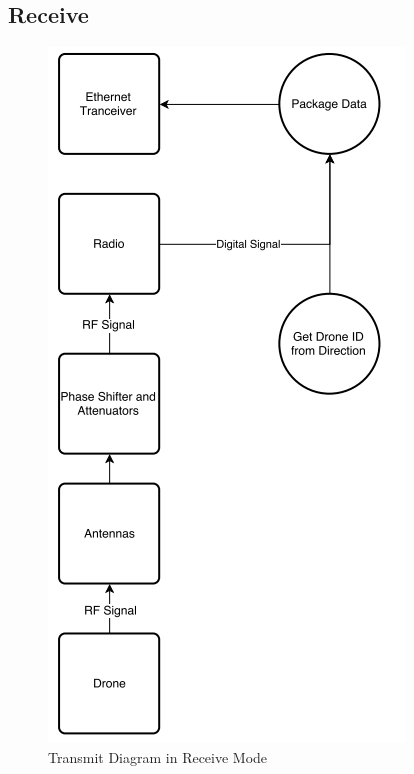 \documentclass[11pt]{article}
\numberwithin{figure}{section}
\begin{document}
\subsection{Receive}
	\begin{figure}[H]
		\centering
		\includegraphics[scale=1]{../SystemDiagram/Receive.png}
		\caption{Transmit Diagram in Receive Mode \label{fig:Transmit Diagram in Receive Mode}}
	\end{figure}
\end{document}
